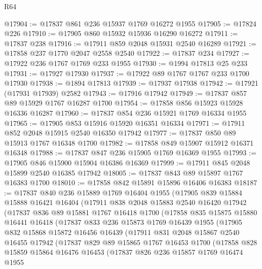 \begin{lexlean}{R64}
\begin{coremodule}
@17904 := @17837 @861 @236 @15937 @1769 @16272 @1955
@17905 := @17824 @226
@17910 := @17905 @860 @15932 @15936 @16290 @16272
@17911 := @17837 @238
@17916 := @17911 @859 @2048 @15931 @2540 @16289
@17921 := @17858 @237 @1770 @2047 @2558 @2540
@17922 := @17837 @234
@17927 := @17922 @236 @1767 @1769 @233 @1955
@17930 := @1994 @17813 @25 @233
@17931 := @17927 @17930
@17937 := @17922 @89 @1767 @1767 @233 @1700 @17930
@17938 := @1894 @17813
@17939 := @17937 @17938
@17942 := @17921 (@17931 @17939) @2582
@17943 := @17916 @17942
@17949 := @17837 @857 @89 @15929 @1767 @16287 @1700
@17954 := @17858 @856 @15923 @15928 @16336 @16287
@17960 := @17837 @854 @236 @15921 @1769 @16334 @1955
@17965 := @17905 @853 @15916 @15920 @16351 @16334
@17971 := @17911 @852 @2048 @15915 @2540 @16350 @17942
@17977 := @17837 @850 @89 @15913 @1767 @16348 @1700
@17982 := @17858 @849 @15907 @15912 @16371 @16348
@17988 := @17837 @847 @236 @15905 @1769 @16369 @1955
@17993 := @17905 @846 @15900 @15904 @16386 @16369
@17999 := @17911 @845 @2048 @15899 @2540 @16385 @17942
@18005 := @17837 @843 @89 @15897 @1767 @16383 @1700
@18010 := @17858 @842 @15891 @15896 @16406 @16383
@18187 := @17837
    @840
    @236
    @15889
    @1769
    @16404
    @1955
    (@17905
      @839
      @15884
      @15888
      @16421
      @16404
      (@17911
        @838
        @2048
        @15883
        @2540
        @16420
        @17942
        (@17837
          @836
          @89
          @15881
          @1767
          @16418
          @1700
          (@17858
            @835
            @15875
            @15880
            @16441
            @16418
            (@17837
              @833
              @236
              @15873
              @1769
              @16439
              @1955
              (@17905
                @832
                @15868
                @15872
                @16456
                @16439
                (@17911
                  @831
                  @2048
                  @15867
                  @2540
                  @16455
                  @17942
                  (@17837
                    @829
                    @89
                    @15865
                    @1767
                    @16453
                    @1700
                    (@17858
                      @828
                      @15859
                      @15864
                      @16476
                      @16453
                      (@17837
                        @826
                        @236
                        @15857
                        @1769
                        @16474
                        @1955

\end{coremodule}
\end{lexlean}
